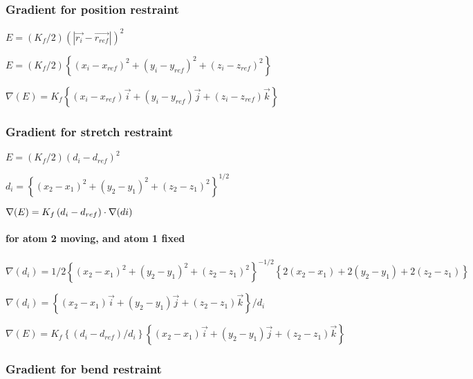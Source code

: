 \subsubsection{Gradient for position restraint}

$E=\left( K_{f}/2\right) \left( \left| \overrightarrow{r_{i}}-%
\overrightarrow{r_{ref}}\right| \right) ^{2}$

$E=\left( K_{f}/2\right) \left\{ \left( x_{i}-x_{ref}\right) ^{2}+\left(
y_{i}-y_{ref}\right) ^{2}+\left( z_{i}-z_{ref}\right) ^{2}\right\} $

$\nabla (E)=K_{f}\left\{ \left( x_{i}-x_{ref}\right) \overrightarrow{i}%
+\left( y_{i}-y_{ref}\right) \overrightarrow{j}+\left( z_{i}-z_{ref}\right) 
\overrightarrow{k}\right\} $

\subsubsection{Gradient for stretch restraint}

$E=\left( K_{f}/2\right) \left( d_{i}-d_{ref}\right) ^{2}$

$d_{i}=\left\{ \left( x_{2}-x_{1}\right) ^{2}+\left( y_{2}-y_{1}\right)
^{2}+\left( z_{2}-z_{1}\right) ^{2}\right\} ^{1/2}$

$\nabla (E)=K_{f}\left( d_{i}-d_{ref}\right) \cdot \nabla (di)\medskip $

\paragraph*{for atom 2 moving, and atom 1 fixed}

$\nabla (d_{i})=1/2\left\{ \left( x_{2}-x_{1}\right) ^{2}+\left(
y_{2}-y_{1}\right) ^{2}+\left( z_{2}-z_{1}\right) ^{2}\right\}
^{-1/2}\left\{ 2\left( x_{2}-x_{1}\right) +2\left( y_{2}-y_{1}\right)
+2\left( z_{2}-z_{1}\right) \right\} $

$\nabla (d_{i})=\left\{ \left( x_{2}-x_{1}\right) \overrightarrow{i}+\left(
y_{2}-y_{1}\right) \overrightarrow{j}+\left( z_{2}-z_{1}\right) 
\overrightarrow{k}\right\} /d_{i}$

$\nabla (E)=K_{f}\left\{ \left( d_{i}-d_{ref}\right) /d_{i}\right\} \left\{
\left( x_{2}-x_{1}\right) \overrightarrow{i}+\left( y_{2}-y_{1}\right) 
\overrightarrow{j}+\left( z_{2}-z_{1}\right) \overrightarrow{k}\right\} $

\subsubsection{Gradient for bend restraint}

